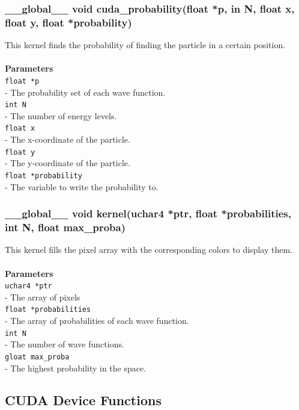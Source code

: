 \documentclass[a4paper, 10pt]{article}
\def\mar{\hspace*{5mm}}
\begin{document}
        \vspace{1cm}
        \subsubsection{\_\_global\_\_ void cuda\_probability(float *p, in N, float x, float y,
        float *probability)}
        This kernel finds the probability of finding the particle in a certain position.\\
        \\{\bf Parameters}\\
        \verb|float *p|\\\mar- The probability set of each wave function.\\
        \verb|int N|\\\mar- The number of energy levels.\\
        \verb|float x|\\\mar- The x-coordinate of the particle.\\
        \verb|float y|\\\mar- The y-coordinate of the particle.\\
        \verb|float *probability|\\\mar- The variable to write the probability to.

        \vspace{1cm}
        \subsubsection{\_\_global\_\_ void kernel(uchar4 *ptr, float *probabilities, int N,
        float max\_proba)}
        This kernel fills the pixel array with the corresponding colors to display them.\\
        \\{\bf Parameters}\\
        \verb|uchar4 *ptr|\\\mar- The array of pixels\\
        \verb|float *probabilities|\\\mar- The array of probabilities of each wave function.\\
        \verb|int N|\\\mar- The number of wave functions.\\
        \verb|gloat max_proba|\\\mar- The highest probability in the space.

    \newpage
    \subsection{CUDA Device Functions}
        \vspace{1cm}
\end{document}
